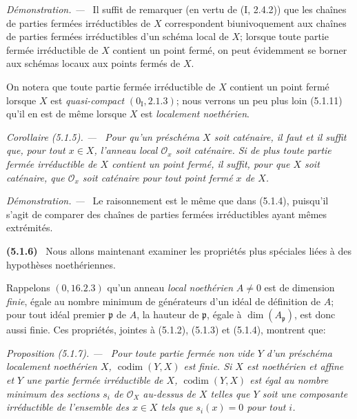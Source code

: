 \documentclass[10pt,oneside]{book}
\newenvironment{env}[1][]{\par\medskip\noindent\textbf{(#1)}\ }{\par}
\newenvironment{proposition}[1][]{%
  \par\medskip\noindent\itshape Proposition (#1). ---\ }{\par}
\newenvironment{corollary}[1][]{%
  \par\medskip\noindent\itshape Corollaire (#1). ---\ }{\par}
\newenvironment{proof}{%
  \par\medskip\noindent\textit{Démonstration. ---\ }}{\par}
\begin{document}
\begin{proof}
Il suffit de remarquer (en vertu de (I, 2.4.2)) que les chaînes de parties
fermées irréductibles de $X$ correspondent biunivoquement aux chaînes de
parties fermées irréductibles d'un schéma local de $X$; lorsque toute partie
fermée irréductible de $X$ contient un point fermé, on peut évidemment se
borner aux schémas locaux aux points fermés de $X$.

On notera que toute partie fermée irréductible de $X$ contient un point fermé
lorsque $X$ est \emph{quasi-compact} $(0_{\mathrm I},2.1.3)$; nous verrons un
peu plus loin (5.1.11) qu'il en est de même lorsque $X$ est \emph{localement
noethérien}.
\end{proof}

\begin{corollary}[5.1.5]
\label{IV.2.5.1.5-fr}
Pour qu'un préschéma $X$ soit caténaire, il faut et il suffit que, pour tout
$x\in X$, l'anneau local $\mathcal O_x$ soit caténaire. Si de plus toute
partie fermée irréductible de $X$ contient un point fermé, il suffit, pour que
$X$ soit caténaire, que $\mathcal O_x$ soit caténaire pour tout point fermé
$x$ de $X$.
\end{corollary}

\begin{proof}
Le raisonnement est le même que dans (5.1.4), puisqu'il s'agit de comparer des
chaînes de parties fermées irréductibles ayant mêmes extrémités.
\end{proof}

\begin{env}[5.1.6]
\label{IV.2.5.1.6-fr}
Nous allons maintenant examiner les propriétés plus spéciales liées à des
hypothèses noethériennes.

Rappelons $(0,16.2.3)$ qu'un anneau \emph{local noethérien} $A\ne0$ est de
dimension \emph{finie}, égale au nombre minimum de générateurs d'un idéal de
définition de $A$; pour tout idéal premier $\mathfrak p$ de $A$, la hauteur de
$\mathfrak p$, égale à $\dim(A_{\mathfrak p})$, est donc aussi finie. Ces
propriétés, jointes à (5.1.2), (5.1.3) et (5.1.4), montrent que:
\end{env}

\begin{proposition}[5.1.7]
\label{IV.2.5.1.7-fr}
Pour toute partie fermée non vide $Y$ d'un préschéma localement noethérien
$X$, $\operatorname{codim}(Y,X)$ est finie. Si $X$ est noethérien et affine
et $Y$ une partie fermée irréductible de $X$, $\operatorname{codim}(Y,X)$ est
égal au nombre minimum des sections $s_i$ de $\mathcal O_X$ au-dessus de $X$
telles que $Y$ soit une composante irréductible de l'ensemble des $x\in X$
tels que $s_i(x)=0$ pour tout $i$.
\end{proposition}
\end{document}
